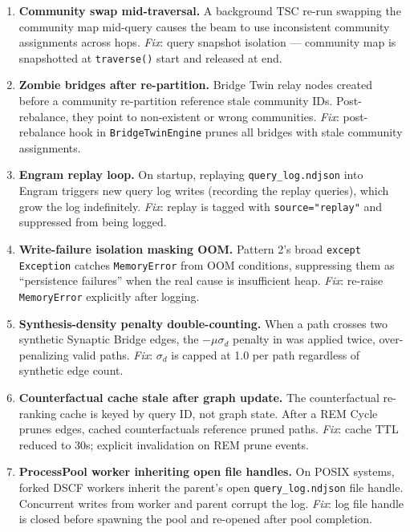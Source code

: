 \documentclass[10pt,twocolumn]{article}
\begin{document}
\begin{enumerate}
  \item \textbf{Community swap mid-traversal.} A background TSC re-run swapping the
        community map mid-query causes the beam to use inconsistent community assignments
        across hops. \emph{Fix}: query snapshot isolation — community map is snapshotted
        at \texttt{traverse()} start and released at end.

  \item \textbf{Zombie bridges after re-partition.} Bridge Twin relay nodes created before
        a community re-partition reference stale community IDs. Post-rebalance, they
        point to non-existent or wrong communities. \emph{Fix}: post-rebalance hook
        in \texttt{BridgeTwinEngine} prunes all bridges with stale community assignments.

  \item \textbf{Engram replay loop.} On startup, replaying \texttt{query\_log.ndjson}
        into Engram triggers new query log writes (recording the replay queries), which
        grow the log indefinitely. \emph{Fix}: replay is tagged with
        \texttt{source="replay"} and suppressed from being logged.

  \item \textbf{Write-failure isolation masking OOM.} Pattern 2's broad
        \texttt{except Exception} catches \texttt{MemoryError} from OOM conditions,
        suppressing them as ``persistence failures'' when the real cause is insufficient
        heap. \emph{Fix}: re-raise \texttt{MemoryError} explicitly after logging.

  \item \textbf{Synthesis-density penalty double-counting.} When a path crosses two
        synthetic Synaptic Bridge edges, the $-\mu\sigma_d$ penalty in \CSA{}
        was applied twice, over-penalizing valid paths. \emph{Fix}: $\sigma_d$ is
        capped at 1.0 per path regardless of synthetic edge count.

  \item \textbf{Counterfactual cache stale after graph update.} The counterfactual
        re-ranking cache is keyed by query ID, not graph state. After a REM Cycle prunes
        edges, cached counterfactuals reference pruned paths. \emph{Fix}: cache TTL
        reduced to 30s; explicit invalidation on REM prune events.

  \item \textbf{ProcessPool worker inheriting open file handles.} On POSIX systems,
        forked DSCF workers inherit the parent's open \texttt{query\_log.ndjson}
        file handle. Concurrent writes from worker and parent corrupt the log.
        \emph{Fix}: log file handle is closed before spawning the pool and re-opened
        after pool completion.


\end{enumerate}
\end{document}
